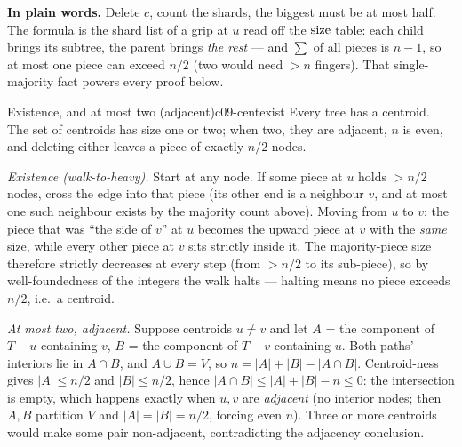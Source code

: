 \noindent\textbf{In plain words.} Delete $c$, count the shards, the biggest must be at
most half. The formula is the shard list of a grip at $u$ read off the $\operatorname{size}$ table:
each child brings its subtree, the parent brings \emph{the rest} --- and $\sum$ of all
pieces is $n-1$, so at most one piece can exceed $n/2$ (two would need $> n$ fingers).
That single-majority fact powers every proof below.

\begin{theorem}{Existence, and at most two (adjacent)}{c09-centexist}
Every tree has a centroid. The set of centroids has size one or two; when two, they are
adjacent, $n$ is even, and deleting either leaves a piece of exactly $n/2$ nodes.
\end{theorem}
\begin{proofbox}
\emph{Existence (walk-to-heavy).} Start at any node. If some piece at $u$ holds $> n/2$
nodes, cross the edge into that piece (its other end is a neighbour $v$, and at most one
such neighbour exists by the majority count above). Moving from $u$ to $v$: the piece
that was ``the side of $v$'' at $u$ becomes the upward piece at $v$ with the \emph{same}
size, while every other piece at $v$ sits strictly inside it. The majority-piece size
therefore strictly decreases at every step (from $> n/2$ to its sub-piece), so by
well-foundedness of the integers the walk halts --- halting means no piece exceeds
$n/2$, i.e.\ a centroid.

\emph{At most two, adjacent.} Suppose centroids $u \ne v$ and let $A$ = the component of
$T-u$ containing $v$, $B$ = the component of $T-v$ containing $u$. Both paths' interiors
lie in $A \cap B$, and $A \cup B = V$, so $n = |A| + |B| - |A \cap B|$. Centroid-ness
gives $|A| \le n/2$ and $|B| \le n/2$, hence $|A \cap B| \le |A| + |B| - n \le 0$: the
intersection is empty, which happens exactly when $u,v$ are \emph{adjacent} (no interior
nodes; then $A, B$ partition $V$ and $|A| = |B| = n/2$, forcing even $n$). Three or more
centroids would make some pair non-adjacent, contradicting the adjacency conclusion.
\end{proofbox}


